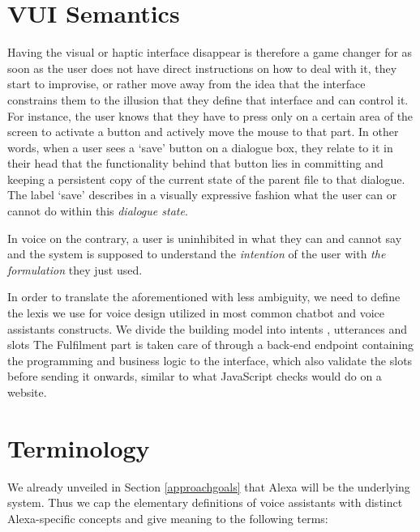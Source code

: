 \section{VUI Semantics}

Having the visual or haptic interface disappear is therefore a game changer for as soon as the user does not have direct instructions on how to deal with it, they start to improvise, or rather move away from the idea that the interface constrains them to the illusion that they define that interface and can control it. For instance, the user knows that they have to press only on a certain area of the screen to activate a button and actively move the mouse to that part. 
In other words,
when a user sees a  `save' button on a dialogue box, they relate to it in their head that the functionality behind that button lies in committing and keeping a persistent copy of the current state of the parent file to that dialogue. The label `save' describes in a visually expressive fashion what the user can or cannot do within this \textit{dialogue state}.


%  

In voice on the contrary, a user is uninhibited in what they can and cannot say and the system is supposed to understand the \textit{intention}%
of the user with \textit{the formulation}%
they just used.

In order to translate the aforementioned with less ambiguity, we need to define the lexis we use for voice design utilized in most common chatbot and voice assistants constructs. 
We divide the building model into intents%
, utterances%
 and slots %
The Fulfilment part is taken care of through a back-end endpoint containing the programming and business logic to the interface, which also validate the slots before sending it onwards, similar to what JavaScript checks would do on a website. %

\section{Terminology}
We already unveiled in Section \ref{approachgoals} that Alexa will be the underlying system. Thus we cap the elementary definitions of voice assistants with distinct Alexa-specific concepts and give meaning to the following terms: 

